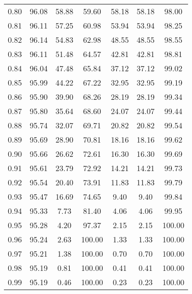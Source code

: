 \begin{tabular}{|c|c|c|c|c|c|c|}
      0.80 &     96.08 &     58.88 &      59.60 &   58.18 &      58.18 &         98.00 \\
      0.81 &     96.11 &     57.25 &      60.98 &   53.94 &      53.94 &         98.25 \\
      0.82 &     96.14 &     54.83 &      62.98 &   48.55 &      48.55 &         98.55 \\
      0.83 &     96.11 &     51.48 &      64.57 &   42.81 &      42.81 &         98.81 \\
      0.84 &     96.04 &     47.48 &      65.84 &   37.12 &      37.12 &         99.02 \\
      0.85 &     95.99 &     44.22 &      67.22 &   32.95 &      32.95 &         99.19 \\
      0.86 &     95.90 &     39.90 &      68.26 &   28.19 &      28.19 &         99.34 \\
      0.87 &     95.80 &     35.64 &      68.60 &   24.07 &      24.07 &         99.44 \\
      0.88 &     95.74 &     32.07 &      69.71 &   20.82 &      20.82 &         99.54 \\
      0.89 &     95.69 &     28.90 &      70.81 &   18.16 &      18.16 &         99.62 \\
      0.90 &     95.66 &     26.62 &      72.61 &   16.30 &      16.30 &         99.69 \\
      0.91 &     95.61 &     23.79 &      72.92 &   14.21 &      14.21 &         99.73 \\
      0.92 &     95.54 &     20.40 &      73.91 &   11.83 &      11.83 &         99.79 \\
      0.93 &     95.47 &     16.69 &      74.65 &    9.40 &       9.40 &         99.84 \\
      0.94 &     95.33 &      7.73 &      81.40 &    4.06 &       4.06 &         99.95 \\
      0.95 &     95.28 &      4.20 &      97.37 &    2.15 &       2.15 &        100.00 \\
      0.96 &     95.24 &      2.63 &     100.00 &    1.33 &       1.33 &        100.00 \\
      0.97 &     95.21 &      1.38 &     100.00 &    0.70 &       0.70 &        100.00 \\
      0.98 &     95.19 &      0.81 &     100.00 &    0.41 &       0.41 &        100.00 \\
      0.99 &     95.19 &      0.46 &     100.00 &    0.23 &       0.23 &        100.00 \\
\bottomrule
\end{tabular}
